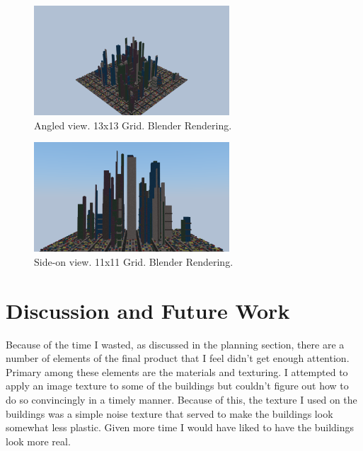 \documentclass{article}
\begin{document}
\begin{figure}[H]
\begin{center}
\includegraphics[width=0.65\textwidth]{render1} %
\caption{Angled view. 13x13 Grid. Blender Rendering.}
\end{center}

\end{figure}
\begin{figure}[H]
\begin{center}
\includegraphics[width=0.65\textwidth]{render0-11} %
\caption{Side-on view. 11x11 Grid. Blender Rendering.}
\end{center}
\end{figure}

\section{Discussion and Future Work}

Because of the time I wasted, as discussed in the planning section, there are a number of elements of the final product that I feel didn't get enough attention. Primary among these elements are the materials and texturing. I attempted to apply an image texture to some of the buildings but couldn't figure out how to do so convincingly in a timely manner. Because of this, the texture I used on the buildings was a simple noise texture that served to make the buildings look somewhat less plastic. Given more time I would have liked to have the buildings look more real. 
\end{document}
